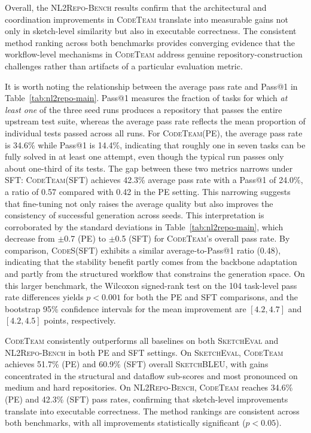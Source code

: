 \documentclass[format=acmsmall, review=false, screen=true]{acmart}
\newcommand{\tool}{\textsc{CodeTeam}\xspace}
\newcommand{\codes}{\textsc{CodeS}\xspace}
\newcommand{\sketcheval}{\textsc{SketchEval}\xspace}
\newcommand{\sketchbleu}{\textsc{SketchBLEU}\xspace}
\newcommand{\nlrepobench}{\textsc{NL2Repo-Bench}\xspace}
\begin{document}
Overall, the \nlrepobench results confirm that the architectural and coordination improvements in \tool translate into measurable gains not only in sketch-level similarity but also in executable correctness. The consistent method ranking across both benchmarks provides converging evidence that the workflow-level mechanisms in \tool address genuine repository-construction challenges rather than artifacts of a particular evaluation metric.

It is worth noting the relationship between the average pass rate and Pass@1 in Table~\ref{tab:nl2repo-main}.
Pass@1 measures the fraction of tasks for which \emph{at least one} of the three seed runs produces a repository that passes the entire upstream test suite, whereas the average pass rate reflects the mean proportion of individual tests passed across all runs.
For \tool (PE), the average pass rate is 34.6\% while Pass@1 is 14.4\%, indicating that roughly one in seven tasks can be fully solved in at least one attempt, even though the typical run passes only about one-third of its tests.
The gap between these two metrics narrows under SFT: \tool (SFT) achieves 42.3\% average pass rate with a Pass@1 of 24.0\%, a ratio of 0.57 compared with 0.42 in the PE setting.
This narrowing suggests that fine-tuning not only raises the average quality but also improves the consistency of successful generation across seeds.
This interpretation is corroborated by the standard deviations in Table~\ref{tab:nl2repo-main}, which decrease from $\pm$0.7 (PE) to $\pm$0.5 (SFT) for \tool's overall pass rate.
By comparison, \codes (SFT) exhibits a similar average-to-Pass@1 ratio (0.48), indicating that the stability benefit partly comes from the backbone adaptation and partly from the structured workflow that constrains the generation space.
On this larger benchmark, the Wilcoxon signed-rank test on the 104 task-level pass rate differences yields $p < 0.001$ for both the PE and SFT comparisons, and the bootstrap 95\% confidence intervals for the mean improvement are $[4.2, 4.7]$ and $[4.2, 4.5]$ points, respectively.

\begin{rqsummary}[RQ1 Summary]
\tool consistently outperforms all baselines on both \sketcheval and \nlrepobench in both PE and SFT settings. On \sketcheval, \tool achieves 51.7\% (PE) and 60.9\% (SFT) overall \sketchbleu, with gains concentrated in the structural and dataflow sub-scores and most pronounced on medium and hard repositories. On \nlrepobench, \tool reaches 34.6\% (PE) and 42.3\% (SFT) pass rates, confirming that sketch-level improvements translate into executable correctness. The method rankings are consistent across both benchmarks, with all improvements statistically significant ($p < 0.05$).
\end{rqsummary}
\end{document}

